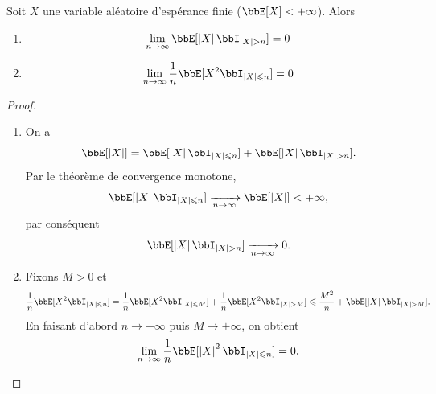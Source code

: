 \begin{lem}
    Soit $X$ une variable aléatoire d'espérance finie ($\bbE[X] < +\infty$). Alors
    \begin{enumerate}
        \item \[ \lim_{n \to \infty} \bbE[\lrvert{X} \bbI_{\lrvert{X} > n}] = 0 \]
        \item \[ \lim_{n \to \infty} \frac{1}{n} \bbE[X^2 \bbI_{\lrvert{X} \leqslant n}] = 0 \]
    \end{enumerate}
\end{lem}

\begin{proof}
    $\ $
    \begin{enumerate}
        \item On a
              \[ \bbE[\lrvert{X}] = \bbE[\lrvert{X} \bbI_{\lrvert{X} \leqslant n}] + \bbE[\lrvert{X} \bbI_{\lrvert{X} > n}]. \]
              Par le théorème de convergence monotone,
              \[ \bbE[\lrvert{X} \bbI_{\lrvert{X} \leqslant n}] \xrightarrow[n \to \infty]{} \bbE[\lrvert{X}] < +\infty, \]
              par conséquent
              \[ \bbE[\lrvert{X} \bbI_{\lrvert{X} > n}] \xrightarrow[n \to \infty]{} 0. \]
        \item Fixons $M > 0$ et
              \[ \frac{1}{n} \bbE[X^2 \bbI_{\lrvert{X} \leqslant n}] = \frac{1}{n} \bbE[X^2 \bbI_{\lrvert{X} \leqslant M}]
                  + \frac{1}{n} \bbE[X^2 \bbI_{\lrvert{X} > M}] \leqslant \frac{M^2}{n} + \bbE[\lrvert{X} \bbI_{\lrvert{X} > M}]. \]
              En faisant d'abord $n \to +\infty$ puis $M \to +\infty$, on obtient
              \[ \lim_{n \to \infty} \frac{1}{n} \bbE[\lrvert{X}^2 \bbI_{\lrvert{X} \leqslant n}] = 0. \]
    \end{enumerate}
\end{proof}

